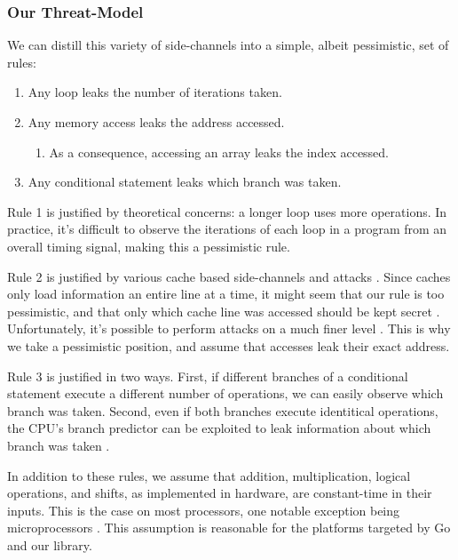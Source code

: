 \documentclass[11pt, a4paper]{article} %
\begin{document}
{\subsubsection{Our Threat-Model}
\label{threat_model}

We can distill this variety of side-channels into a simple,
albeit pessimistic, set of rules:

\begin{enumerate}
  \item Any loop leaks the number of iterations taken.
  \item Any memory access leaks the address accessed.
  \begin{enumerate}
    \item As a consequence, accessing an array leaks the index accessed.
  \end{enumerate}
  \item Any conditional statement leaks which branch was taken.
\end{enumerate}

Rule 1 is justified by theoretical concerns: a longer loop
uses more operations. In practice, it's difficult to observe
the iterations of each loop in a program from an overall timing signal,
making this a pessimistic rule.

Rule 2 is justified by various cache based side-channels and attacks
\cite{
  bernstein_cache-timing_2005,
  yarom_cachebleed_2017,
  cabrera_aldaya_cache-timing_2019}.
Since caches only load information an entire line at a time, it might
seem that our rule is too pessimistic, and that only which cache line
was accessed should be kept secret \cite{brickell_technologies_2011}.
Unfortunately, it's possible to perform
attacks on a much finer level
\cite{
  bernstein_word_2013,
  osvik_cache_2006,
  yarom_cachebleed_2017}.
This is why we take a pessimistic position, and assume
that accesses leak their exact address.


Rule 3 is justified in two ways. First, if different branches of a conditional
statement execute a different number of operations,
we can easily observe which branch was taken. Second, even if both
branches execute identitical operations, the CPU's branch predictor
can be exploited to leak information about which branch was taken
\cite{
  aciicmez_predicting_2006,
  aciicmez_power_2007,
  evtyushkin_jump_2016}.

In addition to these rules, we assume that addition, multiplication,
logical operations, and shifts, as implemented in hardware,
are constant-time in their inputs.
This is the case on most processors, one notable exception being
microprocessors
\cite{pornin_bearssl_nodate}. This assumption is reasonable
for the platforms targeted by Go and our library.

}
\end{document}
